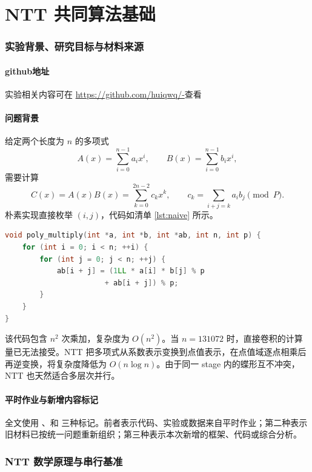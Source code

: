 \part{NTT 共同算法基础}

\section{实验背景、研究目标与材料来源}

\subsection{github地址}
实验相关内容可在 \url{https://github.com/huiqwq/-}查看
\subsection{问题背景}

给定两个长度为 $n$ 的多项式
\[
A(x)=\sum_{i=0}^{n-1}a_ix^i,\qquad
B(x)=\sum_{i=0}^{n-1}b_ix^i,
\]
需要计算
\[
C(x)=A(x)B(x)=\sum_{k=0}^{2n-2}c_kx^k,
\qquad
c_k=\sum_{i+j=k}a_ib_j\pmod P.
\]
朴素实现直接枚举 $(i,j)$，代码如清单 \ref{lst:naive} 所示。

\begin{lstlisting}[title=朴素多项式卷积,label={lst:naive},language={C++}]
void poly_multiply(int *a, int *b, int *ab, int n, int p) {
    for (int i = 0; i < n; ++i) {
        for (int j = 0; j < n; ++j) {
            ab[i + j] = (1LL * a[i] * b[j] % p
                       + ab[i + j]) % p;
        }
    }
}
\end{lstlisting}

该代码包含 $n^2$ 次乘加，复杂度为 $O(n^2)$。当 $n=131072$ 时，直接卷积的计算量已无法接受。NTT 把多项式从系数表示变换到点值表示，在点值域逐点相乘后再逆变换，将复杂度降低为 $O(n\log n)$。由于同一 stage 内的蝶形互不冲突，NTT 也天然适合多层次并行。


\subsection{平时作业与新增内容标记}

全文使用 \oldwork、\fusionwork 和 \newwork 三种标记。前者表示代码、实验或数据来自平时作业；第二种表示旧材料已按统一问题重新组织；第三种表示本次新增的框架、代码或综合分析。


\section{NTT 数学原理与串行基准}\oldwork\ \fusionwork

